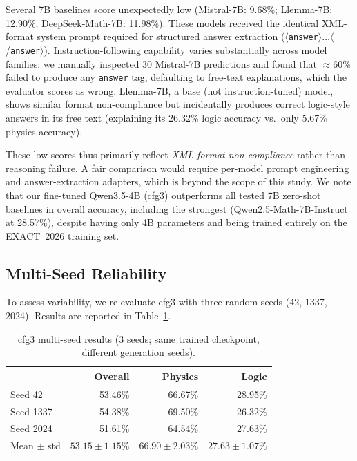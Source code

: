 \documentclass{ieeeaccess}
\newcommand{\basemodelname}{Qwen3.5-4B}
\newcommand{\dataset}{EXACT~2026}
\begin{document}
Several 7B baselines score unexpectedly low (Mistral-7B: 9.68\%;
Llemma-7B: 12.90\%; DeepSeek-Math-7B: 11.98\%).
These models received the identical XML-format system prompt required for
structured answer extraction
($\langle$\texttt{answer}$\rangle\ldots\langle$/\texttt{answer}$\rangle$).
Instruction-following capability varies substantially across model families:
we manually inspected 30 Mistral-7B predictions and found that
$\approx$60\% failed to produce any \texttt{answer} tag, defaulting to
free-text explanations, which the evaluator scores as wrong.
Llemma-7B, a base (not instruction-tuned) model, shows similar format
non-compliance but incidentally produces correct logic-style answers
in its free text (explaining its 26.32\% logic accuracy vs.\ only 5.67\%
physics accuracy).

These low scores thus primarily reflect \emph{XML format
non-compliance} rather than reasoning failure.
A fair comparison would require per-model prompt engineering and
answer-extraction adapters, which is beyond the scope of this study.
We note that our fine-tuned \basemodelname{} (cfg3) outperforms all
tested 7B zero-shot baselines in overall accuracy, including the
strongest (Qwen2.5-Math-7B-Instruct at 28.57\%), despite having only
4B parameters and being trained entirely on the \dataset{} training set.



\subsection{Multi-Seed Reliability}

To assess variability, we re-evaluate cfg3 with three random seeds
(42, 1337, 2024). Results are reported in Table~\ref{tab:multiseed}.

\begin{table}[t]
  \centering
  \caption{cfg3 multi-seed results (3 seeds; same trained checkpoint,
           different generation seeds).}
  \label{tab:multiseed}
  \begin{tabular}{lrrr}
    \toprule
    & \textbf{Overall} & \textbf{Physics} & \textbf{Logic} \\
    \midrule
    Seed 42   & 53.46\% & 66.67\% & 28.95\% \\
    Seed 1337 & 54.38\% & 69.50\% & 26.32\% \\
    Seed 2024 & 51.61\% & 64.54\% & 27.63\% \\
    \midrule
    Mean $\pm$ std & $53.15 \pm 1.15\%$ & $66.90 \pm 2.03\%$ & $27.63 \pm 1.07\%$ \\
    \bottomrule
  \end{tabular}
\end{table}
\end{document}
